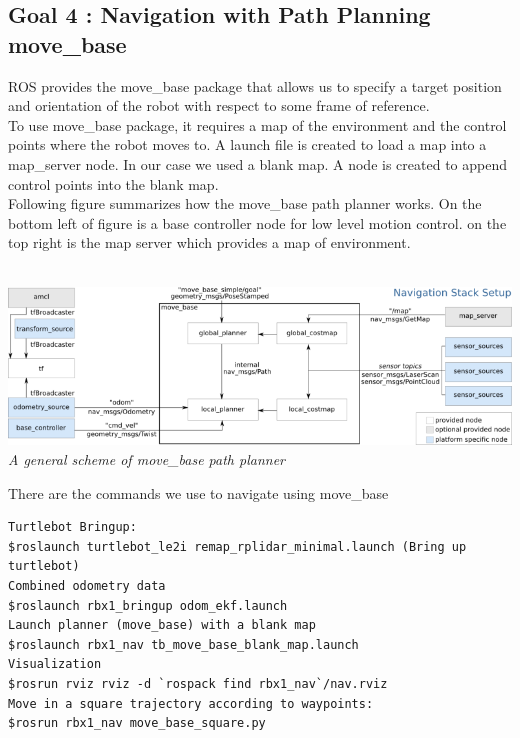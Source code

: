 \documentclass[10pt,a4paper]{article}
\begin{document}
\subsection{Goal 4 : Navigation with Path Planning move\_base}
ROS provides the move\_base package that allows us to specify a target position and orientation of the robot with respect to some frame of reference.\\

To use move\_base package, it requires a map of the environment and the control points where the robot moves to. A launch file is created to load a map into a map\_server node. In our case we used a blank map. A node is created to append control points into the blank map.\\

Following figure summarizes how the move\_base path planner works. On the bottom left of figure is a base controller node for low level motion control. on the top right is the map server which provides a map of environment.\\\\

\begin{center}
\includegraphics[width=\textwidth]{images/overview_small.png}
\textit{A general scheme of move\_base path planner}
\end{center}

There are the commands we use to navigate using move\_base

\begin{lstlisting}[frame=single]
Turtlebot Bringup:
$roslaunch turtlebot_le2i remap_rplidar_minimal.launch (Bring up turtlebot)
Combined odometry data
$roslaunch rbx1_bringup odom_ekf.launch
Launch planner (move_base) with a blank map 
$roslaunch rbx1_nav tb_move_base_blank_map.launch
Visualization
$rosrun rviz rviz -d `rospack find rbx1_nav`/nav.rviz
Move in a square trajectory according to waypoints:
$rosrun rbx1_nav move_base_square.py
\end{lstlisting}
\end{document}
